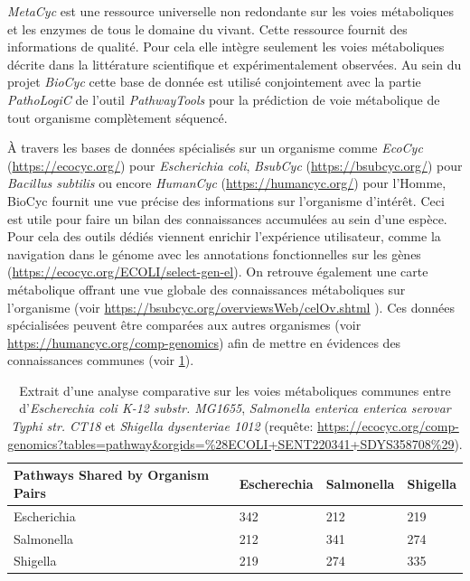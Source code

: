 \begin{refsegment}
    \textit{MetaCyc} \cite{Karp2011,caspi2013metacyc,caspi2016metacyc} est une ressource universelle non redondante sur les voies métaboliques et les enzymes de tous le domaine du vivant. Cette ressource fournit des informations de qualité. Pour cela elle intègre seulement les voies métaboliques décrite dans la littérature scientifique et expérimentalement observées. Au sein du projet \textit{BioCyc} cette base de donnée est utilisé conjointement avec la partie \textit{PathoLogiC} de l'outil \textit{PathwayTools} pour la prédiction de voie métabolique de tout organisme complètement séquencé. 
    
    À travers les bases de données spécialisés sur un organisme comme \textit{EcoCyc} (\url{https://ecocyc.org/}) pour \textit{Escherichia coli}, \textit{BsubCyc} (\url{https://bsubcyc.org/}) pour \textit{Bacillus subtilis} ou encore \textit{HumanCyc} (\url{https://humancyc.org/}) pour l'Homme, BioCyc fournit une vue précise des informations sur l'organisme d'intérêt. Ceci est utile pour faire un bilan des connaissances accumulées au sein d'une espèce. Pour cela des outils dédiés viennent enrichir l'expérience utilisateur, comme la navigation dans le génome avec les annotations fonctionnelles sur les gènes (\url{https://ecocyc.org/ECOLI/select-gen-el}). On retrouve également une carte métabolique offrant une vue globale des connaissances métaboliques sur l'organisme (voir \url{https://bsubcyc.org/overviewsWeb/celOv.shtml} ). Ces données spécialisées peuvent être comparées aux autres organismes  (voir \url{https://humancyc.org/comp-genomics}) afin de mettre en évidences des connaissances communes (voir \cref{tab:compare_tools}).
    
    \begin{table}[H]
    	\caption{Extrait d'une analyse comparative sur les voies métaboliques communes entre d'\textit{Escherechia coli K-12 substr. MG1655}, \textit{Salmonella enterica enterica serovar Typhi str. CT18} et \textit{Shigella dysenteriae 1012} (requête: \url{https://ecocyc.org/comp-genomics?tables=pathway&orgids=\%28ECOLI+SENT220341+SDYS358708\%29}). }
    	\label{tab:compare_tools} 
    	\begin{tabular}{l|lll}
    		\toprule
    		Pathways Shared by Organism Pairs & Escherechia & Salmonella & Shigella \\
    		\midrule
    		Escherichia                       & 342         & 212        & 219      \\           
    		Salmonella                        & 212         & 341        & 274      \\           
    		Shigella                          & 219         & 274        & 335      \\ 
    		\bottomrule
    	\end{tabular}
    \end{table}
    

\end{refsegment}
